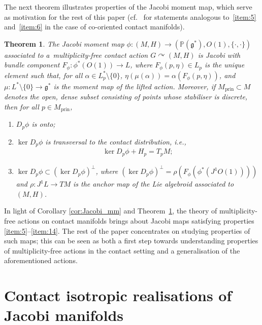 \documentclass[10pt,a4paper]{amsart}
\numberwithin{equation}{section}
\newtheorem{Theorem}{Theorem}[section]
\newcommand{\CM}{(M,H)} %
\newcommand{\pg}{\mathbb{P}(\mathfrak{g}^*)} %
\begin{document}
The next theorem illustrates properties of the Jacobi moment map, which serve as motivation for the rest of this paper (cf.\ \cite[Proposition~3.4, Lemma~3.5 and Proposition~5.1]{Zambon} for statements analogous to~\ref{item:5} and~\ref{item:6} in the case of co-oriented contact
manifolds).

\begin{Theorem}\label{lemma:properties_Jac_mm}
The Jacobi moment map $\phi \colon \CM \to (\pg,O(1),\{\cdot,\cdot\} )$ associated to a~mul\-ti\-plicity-free contact action $ G \curvearrowright \CM$ is Jacobi with bundle component $F_{\phi} \colon \phi^*(O(1)) \to L$, where $F_{\phi}(p,\eta) \in L_p$ is the unique element such that, for all $\alpha \in L^*_p \setminus \{0\}$, $\eta(\mu(\alpha)) = \alpha ( F_{\phi}(p,\eta) )$, and $\mu \colon L^* \setminus \{0\} \to \mathfrak{g}^*$ is the moment map of the lifted action. Moreover, if $M_{\mathrm{prin}} \subset M$ denotes the open, dense subset consisting of points whose stabiliser is
 discrete, then for all $p \in M_{\mathrm{prin}}$,
 \begin{enumerate}[label={\rm (J\arabic*)}, ref={\rm (J\arabic*)}]\itemsep=0pt
 \item\label{item:5} $D_p\phi$ is onto;
 \item \label{item:6} $\ker D_p \phi$ is transversal to the contact distribution, i.e.,
 \begin{gather*}
 \ker D_p \phi + H_p = T_p M;
 \end{gather*}
 \item \label{item:14} $\ker D_p \phi \subset (\ker D_p \phi )^{\perp}$, where $ ( \ker D_p \phi )^{\perp} = \rho (F_{\phi} (\phi^* (J^1O(1) ) ) )$ and $\rho \colon J^1L \to TM$ is the anchor map of the Lie algebroid associated to~$\CM$.
 \end{enumerate}
\end{Theorem}

In light of Corollary \ref{cor:Jacobi_mm} and Theorem~\ref{lemma:properties_Jac_mm}, the theory of multiplicity-free actions on contact manifolds brings about Jacobi maps satisfying properties \ref{item:5}--\ref{item:14}. The rest of the paper concentrates on studying properties of such maps; this can be seen as both a f\/irst step towards understanding properties of multiplicity-free actions in the contact setting and a generalisation
of the aforementioned actions.

\section{Contact isotropic realisations of Jacobi manifolds}\label{sec:cont-isotr-real}
\end{document}
